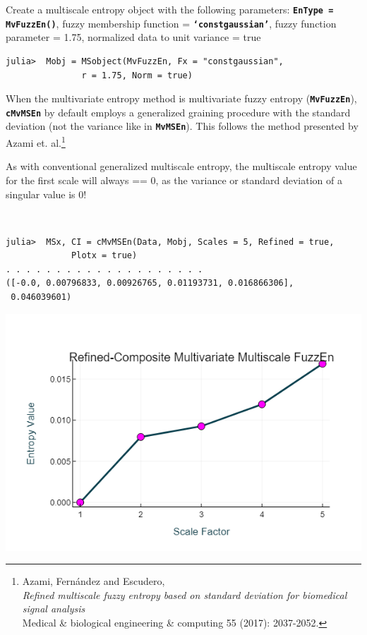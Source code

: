 \documentclass[12pt, a4paper, titlepage, openany]{book}
\begin{document}
\noindent Create a multiscale entropy object with the following parameters: \texttt{\textbf{EnType = MvFuzzEn()}}, fuzzy membership function = \texttt{\textbf{‘constgaussian’}}, fuzzy function parameter = 1.75, normalized data to unit variance = true
\begin{verbatim}
julia>  Mobj = MSobject(MvFuzzEn, Fx = "constgaussian",
               r = 1.75, Norm = true)
\end{verbatim}
\begin{tcolorbox}[colback=ehone!5, colframe=ehtwo!, title=\hypertarget{bidinote}{\textbf{ATTENTION}}, label={BiBox}]
When the multivariate entropy method is multivariate fuzzy entropy (\texttt{\textbf{MvFuzzEn}}), \texttt{\textbf{cMvMSEn}} by default employs a generalized graining procedure with the standard deviation (not the variance like in \texttt{\textbf{MvMSEn}}). This follows the method presented by Azami et. al.\footnote{Azami, Fernández and Escudero,\\ \indent\indent \emph{Refined multiscale fuzzy entropy based on standard deviation for biomedical signal analysis} \\ 
\indent\indent Medical \& biological engineering \& computing 55 (2017): 2037-2052.}
\end{tcolorbox}
\begin{tcolorbox}[colback=ehone!5, colframe=ehtwo!, title=\hypertarget{bidinote}{\textbf{NOTE}}, label={BiBox}]
As with conventional generalized multiscale entropy, the multiscale entropy value for the first scale will always == 0, as the variance or standard deviation of a singular value is 0!
\end{tcolorbox} \

\begin{verbatim}
julia>  MSx, CI = cMvMSEn(Data, Mobj, Scales = 5, Refined = true,
			 Plotx = true)
. . . . . . . . . . . . . . . . . . . . 
([-0.0, 0.00796833, 0.00926765, 0.01193731, 0.016866306],
 0.046039601)
\end{verbatim}
\includegraphics[scale=.7]{rcMvMSEnjl.png}
\end{document}
